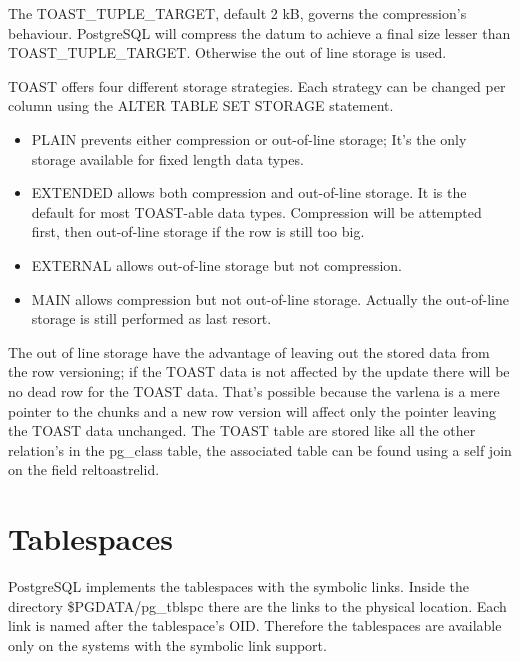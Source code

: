 The TOAST\_TUPLE\_TARGET, default 2 kB, governs the compression's behaviour. PostgreSQL will compress the 
datum to achieve a final size lesser than TOAST\_TUPLE\_TARGET. Otherwise the out of line storage is used.

TOAST offers four different storage strategies. Each strategy can be changed per column using the  ALTER 
TABLE SET STORAGE statement.
\begin{itemize}

\item  PLAIN prevents either compression or out-of-line storage; It's the only storage available 
for fixed length data types.

\item  EXTENDED allows both compression and out-of-line storage. It is the default for most 
TOAST-able data types. Compression will be attempted first, then out-of-line storage if the row is 
still too big.

\item  EXTERNAL allows out-of-line storage but not compression. 

\item  MAIN allows compression but not out-of-line storage. Actually the out-of-line storage is 
still performed as last resort.

\end{itemize}

The out of line storage have the advantage of leaving out the 
stored data from the row versioning; if the TOAST data is not affected by the update there will be 
no dead row for the TOAST data. That's possible because the varlena is a mere pointer to the chunks 
and a new row version will affect only the pointer leaving the TOAST data unchanged.\newline
The TOAST table are stored like all the other relation's in the pg\_class table, the associated 
table can be found using a self join on the field reltoastrelid.\newline


\section{Tablespaces}
\label{sub:TBS-PHYSICAL}
PostgreSQL implements the tablespaces with the symbolic links. Inside the directory \$PGDATA/pg\_tblspc 
there are the links to the physical location. Each link is named after the tablespace's OID. Therefore the 
tablespaces are available only on the systems with the symbolic link support.\newline

